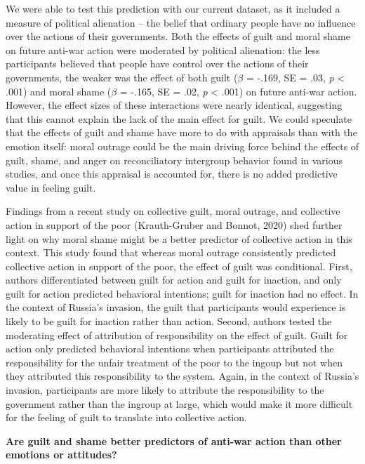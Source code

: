 \documentclass[
]{article}
\begin{document}
We were able to test this prediction with our current dataset, as it included a measure of political alienation -- the belief that ordinary people have no influence over the actions of their governments. Both the effects of guilt and moral shame on future anti-war action were moderated by political alienation: the less participants believed that people have control over the actions of their governments, the weaker was the effect of both guilt (\(\beta\) = -.169, SE = .03, \emph{p} \textless{} .001) and moral shame (\(\beta\) = -.165, SE = .02, \emph{p} \textless{} .001) on future anti-war action. However, the effect sizes of these interactions were nearly identical, suggesting that this cannot explain the lack of the main effect for guilt. We could speculate that the effects of guilt and shame have more to do with appraisals than with the emotion itself: moral outrage could be the main driving force behind the effects of guilt, shame, and anger on reconciliatory intergroup behavior found in various studies, and once this appraisal is accounted for, there is no added predictive value in feeling guilt.

Findings from a recent study on collective guilt, moral outrage, and collective action in support of the poor (Krauth-Gruber and Bonnot, 2020) shed further light on why moral shame might be a better predictor of collective action in this context. This study found that whereas moral outrage consistently predicted collective action in support of the poor, the effect of guilt was conditional. First, authors differentiated between guilt for action and guilt for inaction, and only guilt for action predicted behavioral intentions; guilt for inaction had no effect. In the context of Russia's invasion, the guilt that participants would experience is likely to be guilt for inaction rather than action. Second, authors tested the moderating effect of attribution of responsibility on the effect of guilt. Guilt for action only predicted behavioral intentions when participants attributed the responsibility for the unfair treatment of the poor to the ingoup but not when they attributed this responsibility to the system. Again, in the context of Russia's invasion, participants are more likely to attribute the responsibility to the government rather than the ingroup at large, which would make it more difficult for the feeling of guilt to translate into collective action.

\textbf{Are guilt and shame better predictors of anti-war action than other emotions or attitudes?}
\end{document}
